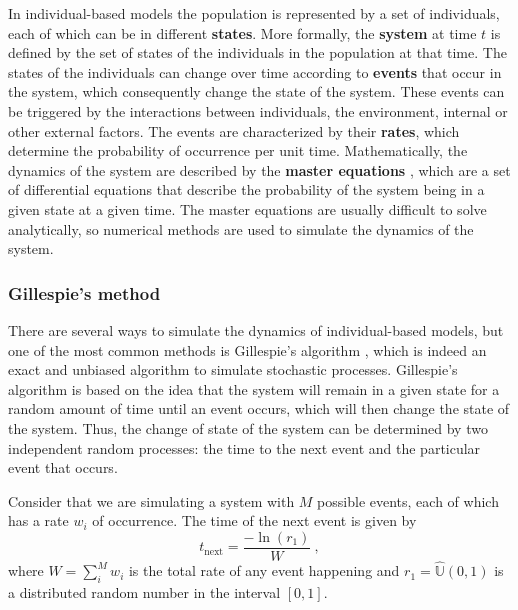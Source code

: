 In individual-based models the population is represented by a set of
individuals, each of which can be in different \textbf{states}. More
formally, the \textbf{system} at time $t$ is defined by the set of states of
the individuals in the population at that time. The states of the individuals
can change over time according to \textbf{events} that occur in the system,
which consequently change the state of the system. These events can be
triggered by the interactions between individuals, the environment, internal or
other external factors. The events are characterized by their \textbf{rates},
which determine the probability of occurrence per unit time. Mathematically,
the dynamics of the system are described by the \textbf{master equations}
\cite{Toral_master_eqs}, which are a set of differential equations that
describe the probability of the system being in a given state at a given
time.
The master equations are usually difficult to solve analytically, so
numerical
methods are used to simulate the dynamics of the system.

\subsubsection*{Gillespie's method}

There are several ways to simulate the dynamics of individual-based models,
but
one of the most common methods is Gillespie's algorithm
\cite{Gillespie1977},
which is indeed an exact and unbiased algorithm to simulate stochastic
processes. Gillespie's algorithm is based on the idea that the system will
remain in a given state for a random amount of time until an event occurs,
which will then change the state of the system. Thus, the change of state of
the system can be determined by two independent random processes: the time to
the next event and the particular event that occurs.

Consider that we are simulating a system with $M$ possible events, each of
which has a rate $w_i$ of occurrence. The time of the next event is given by
\begin{equation}
  t_{\textrm{next}}=\frac{-\ln(r_1)}{W} \ ,
\end{equation}
where $W=\sum_i^M w_i$ is the total rate of any event happening and
$r_1=\hat{\mathbb{U}}(0,1)$ is a distributed random number in the interval
$[0,1]$.

